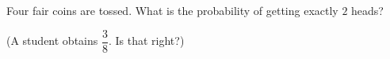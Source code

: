 Four fair coins are tossed. What is the probability of getting exactly $2$ heads?

(A student obtains $\dfrac{3}{8}$. Is that right?)
